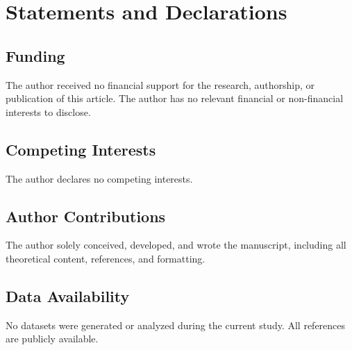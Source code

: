\documentclass[preprints,article,submit,pdftex,moreauthors]{Definitions/mdpi}
\begin{document}

\section*{Statements and Declarations}
\subsection*{Funding}  
The author received no financial support for the research, authorship, or publication of this article.
The author has no relevant financial or non-financial interests to disclose.

\subsection*{Competing Interests}  
The author declares no competing interests.

\subsection*{Author Contributions}  
The author solely conceived, developed, and wrote the manuscript, including all theoretical content, references, and formatting.

\subsection*{Data Availability}  
No datasets were generated or analyzed during the current study. All references are publicly available.
\end{document}
